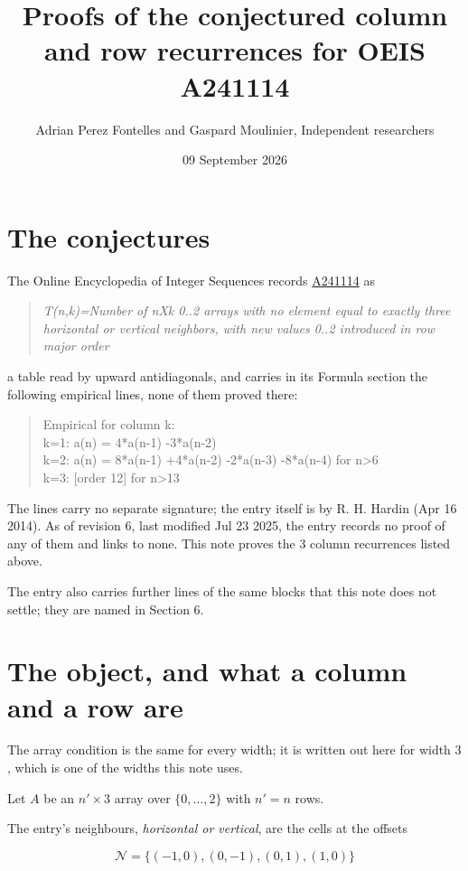 \documentclass[11pt]{article}
\title{Proofs of the conjectured column and row recurrences for OEIS A241114}
\author{Adrian Perez Fontelles and Gaspard Moulinier, Independent researchers}
\date{09 September 2026}
\theoremstyle{definition}
\begin{document}
\maketitle
\section{The conjectures}

The Online Encyclopedia of Integer Sequences records \href{https://oeis.org/A241114}{A241114} as

\begin{quote}\itshape T(n,k)=Number of nXk 0..2 arrays with no element equal to exactly three horizontal or vertical neighbors, with new values 0..2 introduced in row major order\end{quote}

a table read by upward antidiagonals, and carries in its Formula section the following empirical lines, none of them proved there:

\begin{quote}\ttfamily Empirical for column k:\\
k=1: a(n) = 4*a(n-1) -3*a(n-2)\\k=2: a(n) = 8*a(n-1) +4*a(n-2) -2*a(n-3) -8*a(n-4) for n>6\\k=3: [order 12] for n>13\end{quote}

The lines carry no separate signature; the entry itself is by R. H. Hardin (Apr 16 2014). As of revision 6, last modified Jul 23 2025, the entry records no proof of any of them and links to none. This note proves the 3 column recurrences listed above.

The entry also carries further lines of the same blocks that this note does not settle; they are named in Section 6.

\section{The object, and what a column and a row are}

The array condition is the same for every width; it is written out here for width $3$, which is one of the widths this note uses.

Let $A$ be an $n' \times 3$ array over $\{0,\dots,2\}$ with $n' = n$ rows.

The entry's neighbours, {\itshape horizontal or vertical}, are the cells at the offsets

\[\mathcal{N} = \{(-1,0), (0,-1), (0,1), (1,0)\}\]
\end{document}
